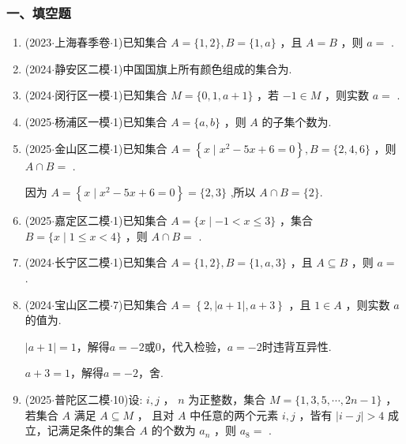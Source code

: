 \subsubsection*{一、填空题}
\begin{enumerate}
    \item (2023$\cdot$上海春季卷$\cdot$1)已知集合 $A = \{ 1,2\} ,B = \{ 1,a\}$ ，且 $A = B$ ，则 $a =$ .
    \item (2024$\cdot$静安区二模$\cdot$1)中国国旗上所有颜色组成的集合为.
    \item (2024$\cdot$闵行区一模$\cdot$1)已知集合 $M = \{ 0,1,a + 1\}$ ，若 $- 1 \in  M$ ，则实数 $a =$ .
    \item (2025$\cdot$杨浦区一模$\cdot$1)已知集合 $A = \{ a,b\}$ ，则 $A$ 的子集个数为.
    \item (2025$\cdot$金山区二模$\cdot$1)已知集合 $A = \left\{  {x \mid  {x}^{2} - {5x} + 6 = 0}\right\}  ,B = \{ 2,4,6\}$ ，则 $A \cap  B =$ .
    \begin{jieda}
        因为 $A = \left\{  {x \mid  {x}^{2} - {5x} + 6 = 0}\right\}   = \{ 2,3\}$ ,所以 $A \cap  B = \{2\}$.
    \end{jieda}
    \item (2025$\cdot$嘉定区二模$\cdot$1)已知集合 $A = \{ x \mid   - 1 < x \leq  3\}$ ，集合 $B = \{ x \mid  1 \leq  x < 4\}$ ，则 $A \cap  B =$ .
    \item (2024$\cdot$长宁区二模$\cdot$1)已知集合 $A = \{ 1,2\} ,B = \{ 1,a,3\}$ ，且 $A \subseteq  B$ ，则 $a =$ .
    \item (2024$\cdot$宝山区二模$\cdot$7)已知集合 $A = \left\{  {2,\left| {a + 1}\right| ,a + 3}\right\}$ ，且 $1 \in  A$ ，则实数 $a$ 的值为.
    \begin{jieda}
        $|a+1| = 1$，解得$a = -2$或$0$，代入检验，$a = -2$时违背互异性.

        $a+3 = 1$，解得$a = -2$，舍.
    \end{jieda}
    \item (2025$\cdot$普陀区二模$\cdot$10)设: ${i,j}$ ， $n$ 为正整数，集合 $M = \{ 1,3,5,\cdots ,{{2n} - 1}\}$ ，若集合 $A$ 满足 $A \subseteq  M$ ， 且对 $A$ 中任意的两个元素 $i,j$ ，皆有 $\left| {i - j}\right|  > 4$ 成立，记满足条件的集合 $A$ 的个数为 ${a}_{n}$ ，则 ${a}_{8} =$ .
    \begin{jieda}
\end{jieda}
\end{enumerate}
